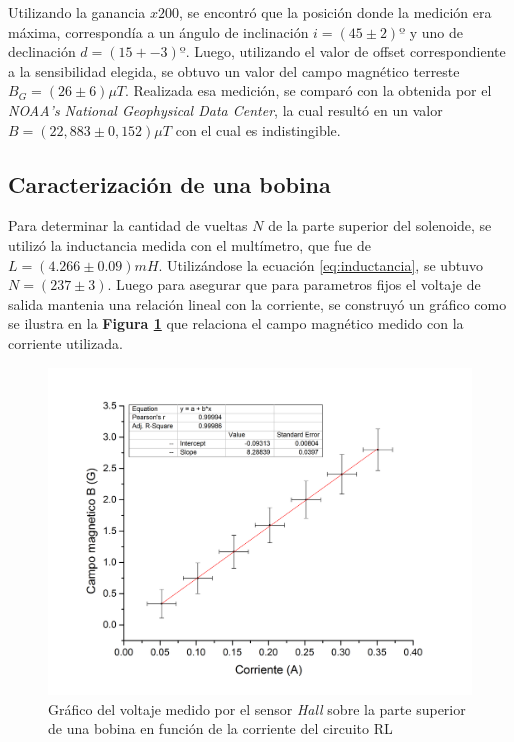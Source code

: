 \documentclass[11pt,a4paper]{article}
\begin{document}
Utilizando la ganancia $x200$, se encontró que la posición donde la medición era máxima, correspondía a un ángulo de inclinación $i = (45 \pm 2)º$ y uno de declinación $d=(15+-3)º$. Luego, utilizando el valor de offset correspondiente a la sensibilidad elegida, se obtuvo un valor del campo magnético terreste $B_{G} = (26 \pm 6)\mu T$. Realizada esa medición, se comparó con la obtenida por el \textit{NOAA's National Geophysical Data Center}, la cual resultó en un valor $B = (22,883 \pm 0,152)\mu T$ con el cual es indistingible.

\subsection{Caracterización de una bobina}

Para determinar la cantidad de vueltas $N$ de la parte superior del solenoide, se utilizó la inductancia medida con el multímetro, que fue de $L=(4.266 \pm 0.09)mH$. Utilizándose la ecuación \eqref{eq:inductancia}, se ubtuvo $N = (237 \pm 3)$. Luego para asegurar que para parametros fijos el voltaje de salida mantenia una relación lineal con la corriente, se construyó un gráfico como se ilustra en la \textbf{Figura \ref{fig:VeVs}} que relaciona el campo magnético medido con la corriente utilizada. 

\begin{figure}[H]
\centering
\includegraphics[scale=0.45]{campo_vs_Corriente_BC}
\caption{Gráfico del voltaje medido por el sensor \textit{Hall} sobre la parte superior de una bobina en función de la corriente del circuito RL }
\label{fig:VeVs}
\end{figure}
\end{document}
